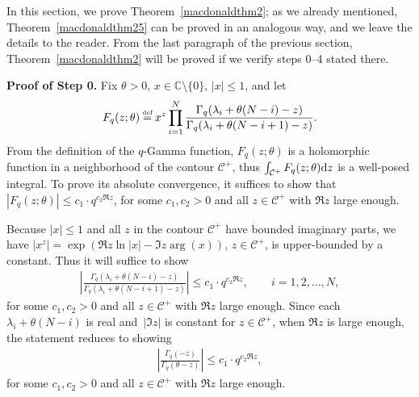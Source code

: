\documentclass[pdftex]{sigma}
\numberwithin{equation}{section}
\newcommand\myeq{\mathrel{\stackrel{\makebox[0pt]{\mbox{\normalfont\tiny def}}}{=}}}
\newcommand{\C}{\mathbb{C}}
\newcommand{\CC}{\mathcal{C}}
\begin{document}
In this section, we prove Theorem~\ref{macdonaldthm2}; as we already mentioned, Theorem~\ref{macdonaldthm25} can be proved in an analogous way, and we leave the details to the reader. From the last paragraph of the previous section, Theorem~\ref{macdonaldthm2} will be proved if we verify steps 0--4 stated there.

\textbf{Proof of Step 0.} Fix $\theta>0$, $x\in\C \setminus \{0\}$, $|x|\leq 1$, and let
\begin{gather*}
F_q(z; \theta) \myeq x^z\prod\limits_{i=1}^N{\frac{\Gamma_q(\lambda_i + \theta(N-i) - z)}{\Gamma_q(\lambda_i + \theta(N-i+1) - z)}}.
 \end{gather*} From the def\/inition of the $q$-Gamma function, $F_q(z; \theta)$ is a holomorphic function in a neighborhood of the contour $\CC^+$, thus $\int_{\CC^+}{F_q(z; \theta){\rm d}z}$ is a well-posed integral. To prove its absolute convergence, it suf\/f\/ices to show that $|F_q(z; \theta)| \leq c_1\cdot q^{c_2 \Re z}$, for some $c_1, c_2 > 0$ and all $z\in\CC^+$ with $\Re z$ large enough.

Because $|x|\leq 1$ and all $z$ in the contour $\CC^+$ have bounded imaginary parts, we have $|x^z| = \exp(\Re z \ln{|x|} - \Im z \arg(x))$, $z\in\CC^+$, is upper-bounded by a constant. Thus it will suf\/f\/ice to show
\begin{gather*}
\left|\frac{\Gamma_q(\lambda_i + \theta(N - i) - z)}{\Gamma_q(\lambda_i + \theta(N - i + 1) - z)}\right| \leq c_1\cdot q^{c_2 \Re z}, \qquad i = 1, 2, \dots, N,
\end{gather*}
for some $c_1, c_2 > 0$ and all $z\in\CC^+$ with $\Re z$ large enough. Since each $\lambda_i + \theta(N-i)$ is real and~$|\Im z|$ is constant for $z\in\CC^+$, when $\Re z$ is large enough, the statement reduces to showing
\begin{gather}\label{toproveineqgamma}
\left|\frac{\Gamma_q(- z)}{\Gamma_q(\theta - z)}\right| \leq c_1\cdot q^{c_2 \Re z},
\end{gather}
for some $c_1, c_2 > 0$ and all $z\in\CC^+$ with $\Re z$ large enough.
\end{document}
